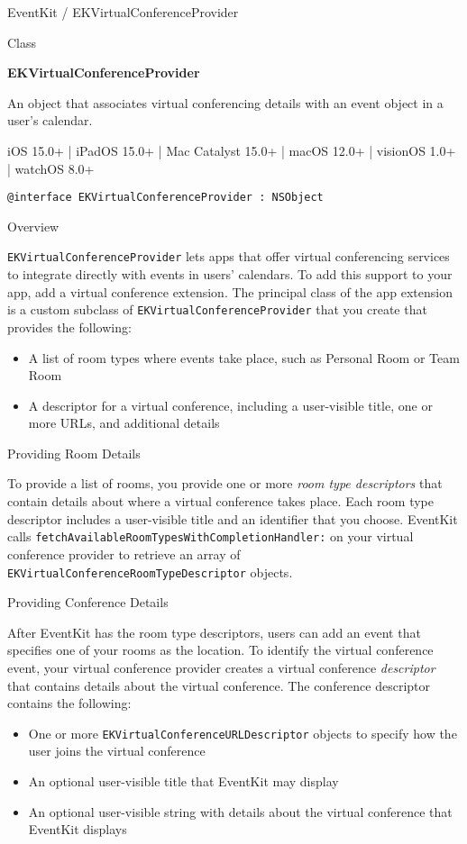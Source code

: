 \documentclass{article}
\title{}
\author{}
\date{}
\begin{document}
EventKit / EKVirtualConferenceProvider

Class

\textbf{EKVirtualConferenceProvider}

An object that associates virtual conferencing details with an event object in a user's calendar.

iOS 15.0+ | iPadOS 15.0+ | Mac Catalyst 15.0+ | macOS 12.0+ | visionOS 1.0+ | watchOS 8.0+

\texttt{@interface EKVirtualConferenceProvider : NSObject}

Overview

\texttt{EKVirtualConferenceProvider} lets apps that offer virtual conferencing services to integrate directly with events in users' calendars. To add this support to your app, add a virtual conference extension. The principal class of the app extension is a custom subclass of \texttt{EKVirtualConferenceProvider} that you create that provides the following:

\begin{itemize}
    \item A list of room types where events take place, such as Personal Room or Team Room
    \item A descriptor for a virtual conference, including a user-visible title, one or more URLs, and additional details
\end{itemize}

Providing Room Details

To provide a list of rooms, you provide one or more \textit{room type descriptors} that contain details about where a virtual conference takes place. Each room type descriptor includes a user-visible title and an identifier that you choose. EventKit calls \texttt{fetchAvailableRoomTypesWithCompletionHandler:} on your virtual conference provider to retrieve an array of \texttt{EKVirtualConferenceRoomTypeDescriptor} objects.

Providing Conference Details

After EventKit has the room type descriptors, users can add an event that specifies one of your rooms as the location. To identify the virtual conference event, your virtual conference provider creates a virtual conference \textit{descriptor} that contains details about the virtual conference. The conference descriptor contains the following:

\begin{itemize}
    \item One or more \texttt{EKVirtualConferenceURLDescriptor} objects to specify how the user joins the virtual conference
    \item An optional user-visible title that EventKit may display
    \item An optional user-visible string with details about the virtual conference that EventKit displays
\end{itemize}
\end{document}
